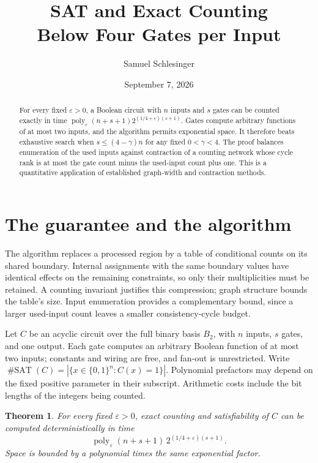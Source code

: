 \documentclass[11pt]{article}
\title{SAT and Exact Counting\\Below Four Gates per Input}
\author{Samuel Schlesinger}
\date{September 7, 2026}
\newtheorem{theorem}{Theorem}
\newcommand{\B}{\{0,1\}}
\newcommand{\poly}{\operatorname{poly}}
\newcommand{\satcount}{\operatorname{\#SAT}}
\begin{document}
\maketitle
\begin{abstract}
For every fixed $\varepsilon>0$, a Boolean circuit with $n$ inputs
and $s$ gates can be counted exactly in time
$\poly_\varepsilon(n+s+1)2^{(1/4+\varepsilon)(s+1)}$.
Gates compute arbitrary functions of at most two inputs, and the
algorithm permits exponential space. It therefore beats exhaustive
search when $s\le(4-\gamma)n$ for any fixed $0<\gamma<4$.
The proof balances enumeration of the used inputs against contraction
of a counting network whose cycle rank is at most the gate count
minus the used-input count plus one. This is a quantitative application
of established graph-width and contraction methods.
\end{abstract}

\section{The guarantee and the algorithm}

The algorithm replaces a processed region by a table of conditional
counts on its shared boundary. Internal assignments with the same
boundary values have identical effects on the remaining constraints,
so only their multiplicities must be retained. A counting invariant
justifies this compression; graph structure bounds the table's size.
Input enumeration provides a complementary bound, since a larger
used-input count leaves a smaller consistency-cycle budget.

Let $C$ be an acyclic circuit over the full binary basis $B_2$,
with $n$ inputs, $s$ gates, and one output. Each gate computes an
arbitrary Boolean function of at most two inputs; constants and
wiring are free, and fan-out is unrestricted. Write
$\satcount(C)=|\{x\in\B^n:C(x)=1\}|$.
Polynomial prefactors may depend on the fixed positive parameter
in their subscript. Arithmetic costs include the bit lengths of
the integers being counted.

\begin{theorem}\label{thm:main}
For every fixed $\varepsilon>0$, exact counting and satisfiability
of $C$ can be computed deterministically in time
\begin{equation}\label{eq:headline}
 \boxed{\;\poly_\varepsilon(n+s+1)\,
 2^{(1/4+\varepsilon)(s+1)}.\;}
\end{equation}
Space is bounded by a polynomial times the same exponential factor.
\end{theorem}
\end{document}

